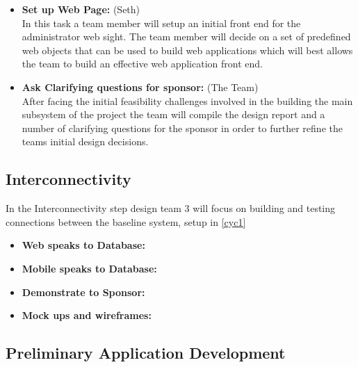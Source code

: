 \documentclass[Letter,11pt]{article}
\begin{document}
\begin{itemize}
			\item\textbf{Set up Web Page:} (Seth)\\
			In this task a team member will setup an initial front end for the administrator web sight. The team member will decide on a set of predefined web objects that can be used to build web applications which will best allows the team to build an effective web application front end. 
			
			\item\textbf{Ask Clarifying questions for sponsor:} (The Team)\\
			After facing the initial feasibility challenges involved in the building the main subsystem of the project the team will compile the design report and a number of clarifying questions for the sponsor in order to further refine the teams initial design decisions. 
		\end{itemize}
		
		
		
	\subsection{Interconnectivity}\label{connect}
		In the Interconnectivity step design team 3 will focus on building and testing connections between the baseline system, setup in \ref{cyc1}
		\begin{itemize}
			\item\textbf{Web speaks to Database:}\\
			
			
			\item \textbf{Mobile speaks to Database:}\\
			
			\item\textbf{Demonstrate to Sponsor:}\\
			
			\item\textbf{Mock ups and wireframes:}\\
			
		\end{itemize}
		
		\subsection{Preliminary Application Development}\label{dev1}
		
\end{document}
